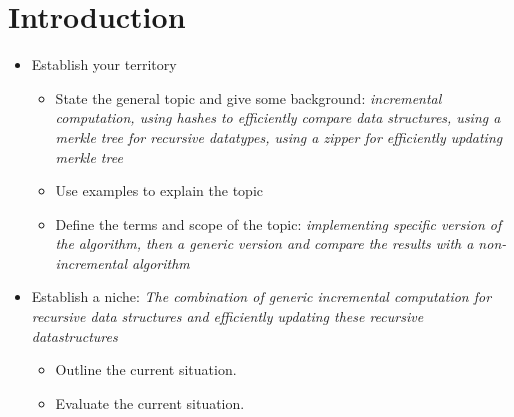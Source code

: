 \chapter{Introduction}



\begin{itemize}
  \item Establish your territory
  \begin{itemize}
    \item State the general topic and give some background: \textit{incremental computation, using hashes to efficiently compare data structures, using a merkle tree for recursive datatypes, using a zipper for efficiently updating merkle tree}
    \item Use examples to explain the topic
    \item Define the terms and scope of the topic: \textit{implementing specific version of the algorithm, then a generic version and compare the results with a non-incremental algorithm}
  \end{itemize}
  \item Establish a niche: \textit{The combination of generic incremental computation for recursive data structures and efficiently updating these recursive datastructures}
  \begin{itemize}
    \item Outline the current situation. 
    \item Evaluate the current situation.
  \end{itemize}
\end{itemize}

